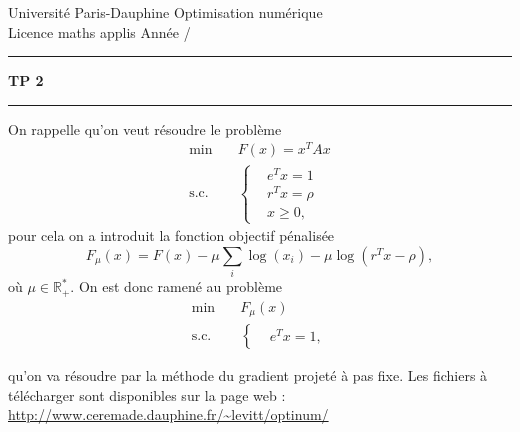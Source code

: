 \documentclass[10pt,a4paper,fleqn]{report}
\makeatletter
\def\cleardoublepage{\clearpage\if@twoside\ifodd\c@page\else\hbox{}\thispagestyle{empty}\newpage\fi\fi}
\makeatother
\begin{document}
\cleardoublepage

\noindent
Universit\'e Paris-Dauphine     \hfill      Optimisation num\'erique\\
Licence maths applis      \hfill      Ann\'ee /

\medskip

\hrule

\medskip



\begin{center}

\textbf{\huge TP 2}

\smallskip

\rule{10cm}{0.4pt}

\end{center}

On rappelle qu'on veut résoudre le problème
\begin{align*}
  \text{min} \quad&F(x)=x^{T} A x\\
  \text{s.c.}\quad&\begin{cases}
    &e^{T} x = 1\\
  &r^{T} x = \rho\\
  &x \geq 0,
  \end{cases}
\end{align*}
pour cela on a introduit la fonction objectif pénalisée
\[F_\mu(x) = F(x) - \mu \sum_i \log(x_i) -\mu \log(r^T x - \rho),\]
où $\mu \in \mathbb{R}_+^*$.
On est donc ramené au problème
\begin{align*}
  \text{min} \quad&F_\mu(x)\\
  \text{s.c.}\quad&\begin{cases}
    &e^{T} x = 1,
  \end{cases}
\end{align*}

qu'on va résoudre par la méthode du gradient projeté à pas fixe. Les fichiers à
télécharger sont disponibles sur la page web :
\url{http://www.ceremade.dauphine.fr/~levitt/optinum/}
\end{document}
